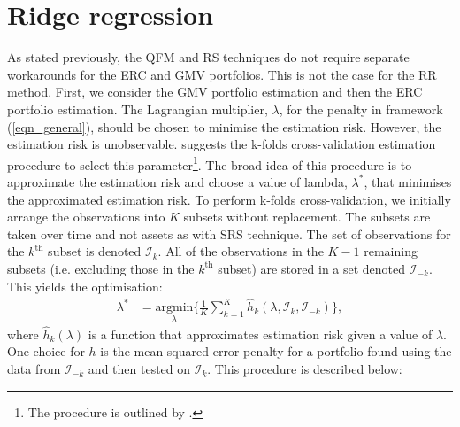 \documentclass[a4paper,11pt,nocenter,bold,noupper,headcount]{mythesis}
\theoremstyle{plain}
\theoremstyle{definition}
\begin{document}
\section{Ridge regression}

As stated previously, the QFM and RS techniques do not require separate workarounds for the ERC and GMV portfolios. This is not the case for the RR method. First, we consider the GMV portfolio estimation and then the ERC portfolio estimation. The Lagrangian multiplier, $\lambda$, for the penalty in framework (\ref{eqn_general}), should be chosen to minimise the estimation risk. However, the estimation risk is unobservable. \cite{K18} suggests the k-folds cross-validation estimation procedure to select this parameter\footnote{The procedure is outlined by \cite{FHT01}.}. The broad idea of this procedure is to approximate the estimation risk and choose a value of lambda, $\lambda^*$, that minimises the approximated estimation risk. To perform k-folds cross-validation, we initially arrange the observations into $K$ subsets without replacement. The subsets are taken over time and not assets as with SRS technique. The set of observations for the $k^{\text{th}}$ subset is denoted $\mathcal{I}_k$. All of the observations in the $K - 1$ remaining subsets (i.e. excluding those in the $k^{\text{th}}$ subset) are stored in a set denoted $\mathcal{I}_{-k}$. This yields the optimisation:
\begin{align}  \label{score_func}
\lambda^* & = \underset{\lambda}{\text{argmin}} \Big \{ \frac{1}{K} \sum_{k =1}^K \hat{h}_k(\lambda, \mathcal{I}_k, \mathcal{I}_{-k})\Big \},
\end{align}
where $\hat{h}_k(\lambda)$ is a function that approximates estimation risk given a value of $\lambda$. One choice for $h$ is the mean squared error penalty for a portfolio found using the data from $\mathcal{I}_{-k}$ and then tested on $\mathcal{I}_k$. This procedure is described below:
\end{document}
